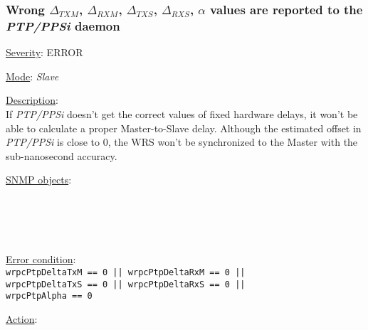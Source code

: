 \subsubsection{\bf Wrong $\Delta_{TXM}$, $\Delta_{RXM}$, $\Delta_{TXS}$,
		$\Delta_{RXS}$, $\alpha$ values are reported to the \emph{PTP/PPSi} daemon}
		\label{fail:timing:deltas_report}
		\begin{pck_descr}
			\item [] \underline{Severity}: ERROR
			\item [] \underline{Mode}: \emph{Slave}
			\item [] \underline{Description}:\\
				If \emph{PTP/PPSi} doesn't get the correct values of fixed hardware delays,
				it won't be able to calculate a proper Master-to-Slave delay. Although
				the estimated offset in \emph{PTP/PPSi} is close to 0, the WRS won't be
				synchronized to the Master with the sub-nanosecond accuracy.
			\item [] \underline{SNMP objects}:\\
				{\footnotesize
				\\
				\\
				\\
				\\
				 }
			\item [] \underline{Error condition}:\\
				{\footnotesize
				\texttt{wrpcPtpDeltaTxM == 0 || wrpcPtpDeltaRxM == 0 ||}\\
				\texttt{wrpcPtpDeltaTxS == 0 || wrpcPtpDeltaRxS == 0 ||}\\
				\texttt{wrpcPtpAlpha == 0} }
      \item [] \underline{Action}:\\
		\end{pck_descr}

